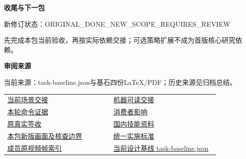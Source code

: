 \documentclass[11pt,a4paper]{article}
\newcommand{\reviewsubsection}[1]{\par\Needspace{4\baselineskip}\vspace{4pt}\begin{center}{\titlelatin\titlecjk\bfseries\fontsize{12}{18}\selectfont #1}\end{center}}
\begin{document}
\reviewsubsection{3.3 收尾与下一包}
新修订状态：ORIGINAL\_\allowbreak{}DONE\_\allowbreak{}NEW\_\allowbreak{}SCOPE\_\allowbreak{}REQUIRES\_\allowbreak{}REVIEW


先完成本包当前验收，再按实际依赖交接；可选策略扩展不成为首版核心研究依赖。


\begin{minipage}{\linewidth}
\reviewsubsection{3.4 审阅来源}
当前来源：task-\allowbreak{}baseline.json与基石四份LaTeX/\allowbreak{}PDF；历史来源见归档总结。


\begingroup\small\setlength{\tabcolsep}{4pt}\begin{tabular}{@{}p{0.48\linewidth}p{0.48\linewidth}@{}}
\href{file:///D:/Agent/srp/agent/tasks/V-02/outputs/current-scenes.md}{当前场景交接} & \href{file:///D:/Agent/srp/agent/tasks/V-02/outputs/current-scenes.json}{机器可读交接}\\[4pt]
\href{file:///D:/Agent/srp/agent/tasks/V-02/evidence/verification.json}{本轮命令证据} & \href{file:///D:/Agent/srp/agent/tasks/V-02/evidence/consumer-impact.md}{消费者影响}\\[4pt]
\href{file:///D:/Agent/srp/agent/governance/planning/2026-08-05_SRP_IJHCI_\%E5\%85\%A8\%E9\%A1\%B9\%E7\%9B\%AE1-12\%E6\%AD\%A5\%E8\%A7\%84\%E5\%88\%92\%E8\%AE\%BE\%E8\%AE\%A1\%E5\%8C\%85_v1.0/20_\%E4\%BA\%A7\%E5\%93\%81\%E4\%B8\%8E\%E5\%9C\%BA\%E6\%99\%AF\%E8\%AE\%BE\%E8\%AE\%A1/V-02_\%E5\%A4\%A9\%E6\%B0\%94\%E6\%A6\%82\%E5\%BF\%B5\%E4\%B8\%8E\%E5\%91\%BC\%E5\%90\%B8\%E6\%8F\%90\%E7\%A4\%BA\%E4\%B8\%93\%E9\%A1\%B9\%E5\%8E\%9F\%E5\%9E\%8B/V-02_\%E6\%8A\%80\%E6\%9C\%AF\%E9\%AA\%8C\%E6\%94\%B6\%E8\%AE\%B0\%E5\%BD\%95_\%E5\%B7\%B2\%E7\%AD\%BE\%E7\%BD\%B2.md}{原真实签收} & \href{file:///D:/Agent/srp/agent/governance/planning/2026-08-05_SRP_IJHCI_\%E5\%85\%A8\%E9\%A1\%B9\%E7\%9B\%AE1-12\%E6\%AD\%A5\%E8\%A7\%84\%E5\%88\%92\%E8\%AE\%BE\%E8\%AE\%A1\%E5\%8C\%85_v1.0/24_\%E5\%9B\%A2\%E9\%98\%9F\%E4\%BB\%BB\%E5\%8A\%A1\%E4\%B8\%8E\%E9\%A1\%B9\%E7\%9B\%AE\%E6\%B2\%BB\%E7\%90\%86/08_\%E4\%BB\%BB\%E5\%8A\%A1\%E6\%8A\%80\%E8\%83\%BD\%E4\%B8\%8E\%E5\%9B\%BD\%E5\%86\%85\%E5\%AD\%A6\%E4\%B9\%A0\%E8\%B5\%84\%E6\%96\%99_v1.0.md}{国内技能资料}\\[4pt]
\href{file:///D:/Agent/srp/agent/tasks/V-02/outputs/current-implementation-evidence.md}{本包新版画面及核查边界} & \href{file:///D:/Agent/srp/agent/design/weather/2026-10-08_Storm\%E4\%B8\%8E\%E7\%BA\%AF\%E7\%B2\%92\%E5\%AD\%90\%E5\%8F\%8C\%E7\%8E\%AF\%E5\%AE\%9E\%E6\%96\%BD\%E6\%A0\%87\%E5\%87\%86.md}{统一实施标准}\\[4pt]
\href{file:///D:/Agent/srp/human/assets/previews/2026-10-08/member-storm-particle-rings/frame-index.json}{成员原视频帧索引} & \href{file:///D:/Agent/srp/agent/design/design-foundation-20261008/task-baseline.json}{当前设计基线 task-\allowbreak{}baseline.json}\\[4pt]

\end{tabular}
\end{minipage}
\end{document}
